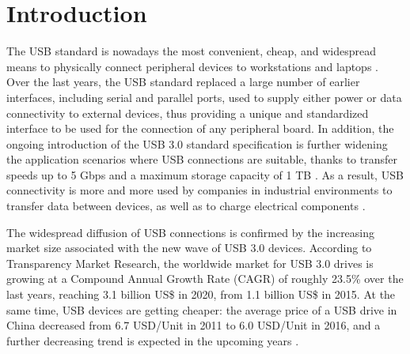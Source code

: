 \documentclass[acmsmall, authorversion]{acmart}
\begin{document}


\maketitle

\section{Introduction}
\label{sec:intro}

The \ac{USB} standard is nowadays the most convenient, cheap, and widespread means to physically connect peripheral devices to workstations and laptops \cite{usb3dot0}. Over the last years, the \ac{USB} standard replaced a large number of earlier interfaces, including serial and parallel ports, used to supply either power or data connectivity to external devices, thus providing a unique and standardized interface to be used for the connection of any peripheral board. 
In addition, the ongoing introduction of the USB 3.0 standard specification is further widening the application scenarios where USB connections are suitable, thanks to transfer speeds up to 5 Gbps and a maximum storage capacity of 1 TB \cite{Lyu2019}. As a result, USB connectivity is more and more used by companies in industrial environments to transfer data between devices, as well as to charge electrical components \cite{Prz2016}.

The widespread diffusion of USB connections is confirmed by the increasing market size associated with the new wave of USB 3.0 devices. According to Transparency Market Research, the worldwide market for USB 3.0 drives is growing at a Compound Annual Growth Rate (CAGR) of roughly 23.5\% over the last years, reaching 3.1 billion US\$ in 2020, from 1.1 billion US\$ in 2015. At the same time, USB devices are getting cheaper: the average price of a USB drive in China decreased from 6.7 USD/Unit in 2011 to 6.0 USD/Unit in 2016, and a further decreasing trend is expected in the upcoming years \cite{tmr2017}.   
\end{document}
